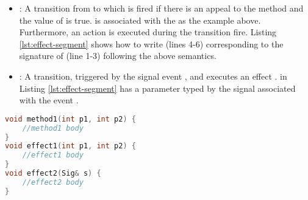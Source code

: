 \noindent
{}
\begin{itemize}[\footnotesize]
\item {}: A transition from  to  which is fired if there is an appeal to the method  and the value of  is true.
 is associated with the  as the example above.
Furthermore, an action  is executed during the transition fire.
Listing \ref{lst:effect-segment} shows how to write  (lines 4-6) corresponding to the signature of  (line 1-3) following the above semantics.

\item {}: A transition, triggered by the signal event , and executes an effect .
 in Listing \ref{lst:effect-segment} has a parameter typed by the signal  associated with the event .
\end{itemize}

\begin{minipage}{1.05\columnwidth}
\begin{lstlisting}[language=C++, caption=A segment of C++ front-end code, label=lst:effect-segment,frame=f]
void method1(int p1, int p2) {
	//method1 body
}
void effect1(int p1, int p2) {
	//effect1 body
}
void effect2(Sig& s) {
	//effect2 body
}
\end{lstlisting}
\end{minipage}